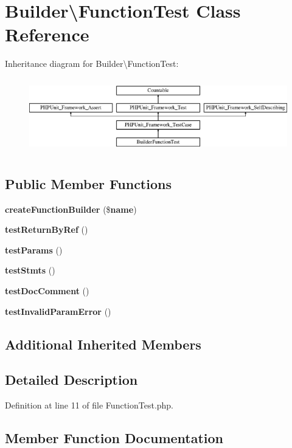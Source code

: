 \section{Builder\textbackslash{}Function\+Test Class Reference}
\label{class_php_parser_1_1_builder_1_1_function_test}
Inheritance diagram for Builder\textbackslash{}Function\+Test\+:\begin{figure}[H]
\begin{center}
\leavevmode
\includegraphics[height=3.303835cm]{class_php_parser_1_1_builder_1_1_function_test}
\end{center}
\end{figure}
\subsection*{Public Member Functions}
\begin{DoxyCompactItemize}
\item 
{\bf create\+Function\+Builder} (\${\bf name})
\item 
{\bf test\+Return\+By\+Ref} ()
\item 
{\bf test\+Params} ()
\item 
{\bf test\+Stmts} ()
\item 
{\bf test\+Doc\+Comment} ()
\item 
{\bf test\+Invalid\+Param\+Error} ()
\end{DoxyCompactItemize}
\subsection*{Additional Inherited Members}


\subsection{Detailed Description}


Definition at line 11 of file Function\+Test.\+php.



\subsection{Member Function Documentation}

